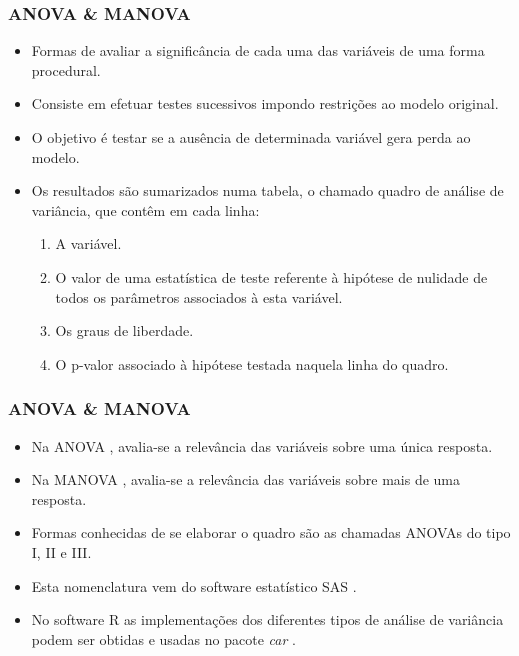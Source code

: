 \documentclass[10pt,
  aspectratio=169,
  serif,
  mathserif,
  professionalfont,
  compress,
  handout,
  ]{beamer}\usepackage[]{graphicx}\usepackage[]{color}
\begin{document}

\begin{frame}
  \frametitle{ANOVA \& MANOVA}

  \begin{itemize}
    \itemsep 2ex

  \item Formas de avaliar a significância de cada uma das variáveis de uma forma procedural.  
  
  \item Consiste em efetuar testes sucessivos impondo restrições ao modelo original. 

  \item O objetivo é testar se a ausência de determinada variável gera perda ao modelo. 
  
  \item Os resultados são sumarizados numa tabela, o chamado quadro de análise de variância, que contêm em cada linha: 
  
  \begin{enumerate}
  \item A variável.
  \item O valor de uma estatística de teste referente à hipótese de nulidade de todos os parâmetros associados à esta variável.
  \item Os graus de liberdade.
  \item O p-valor associado à hipótese testada naquela linha do quadro.
  \end{enumerate}


  \end{itemize}

\end{frame}


\begin{frame}
  \frametitle{ANOVA \& MANOVA}

  \begin{itemize}
    \itemsep 2ex

  \item Na ANOVA \cite{anova_fisher}, avalia-se a relevância das variáveis sobre uma única resposta. 

  \item Na MANOVA \cite{manova}, avalia-se a relevância das variáveis sobre mais de uma resposta. 

  \item Formas conhecidas de se elaborar o quadro são as chamadas ANOVAs do tipo I, II e III. 

  \item Esta nomenclatura vem do software estatístico SAS \cite{sas}. 

  \item No software R \cite{softwareR} as implementações dos diferentes tipos de análise de variância podem ser obtidas e usadas no pacote \emph{car} \cite{car}.
  
  \end{itemize}

\end{frame}
\end{document}
